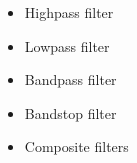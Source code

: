 \begin{itemize}
\item Highpass filter
\item Lowpass filter
\item Bandpass filter
\item Bandstop filter
\item Composite filters
\end{itemize}
